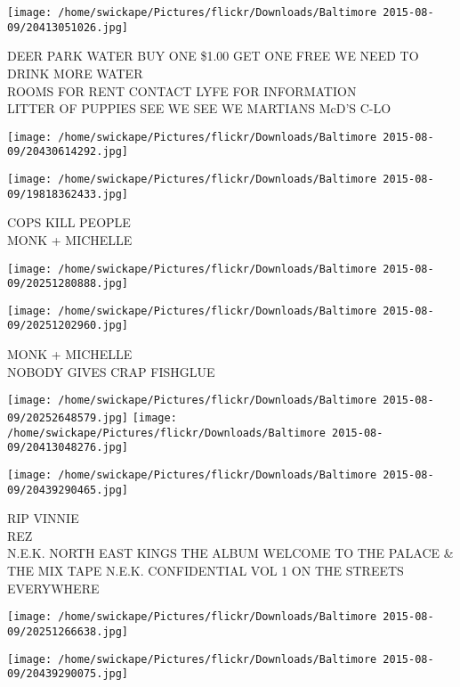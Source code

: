 \documentclass[10pt,letterpaper]{article}
\begin{document}
\texttt{[image: /home/swickape/Pictures/flickr/Downloads/Baltimore 2015-08-09/20413051026.jpg]}

DEER PARK WATER BUY ONE \$1.00 GET ONE FREE WE NEED TO DRINK MORE WATER\\
ROOMS FOR RENT CONTACT LYFE FOR INFORMATION\\
LITTER OF PUPPIES SEE WE SEE WE MARTIANS McD'S C{-}LO\\
\pagebreak

\texttt{[image: /home/swickape/Pictures/flickr/Downloads/Baltimore 2015-08-09/20430614292.jpg]}

\vspace{0.25in}
\texttt{[image: /home/swickape/Pictures/flickr/Downloads/Baltimore 2015-08-09/19818362433.jpg]}

COPS KILL PEOPLE\\
MONK + MICHELLE\\
\pagebreak

\texttt{[image: /home/swickape/Pictures/flickr/Downloads/Baltimore 2015-08-09/20251280888.jpg]}

\vspace{0.25in}
\texttt{[image: /home/swickape/Pictures/flickr/Downloads/Baltimore 2015-08-09/20251202960.jpg]}

MONK + MICHELLE\\
NOBODY GIVES CRAP FISHGLUE\\
\pagebreak

\texttt{[image: /home/swickape/Pictures/flickr/Downloads/Baltimore 2015-08-09/20252648579.jpg]}
\texttt{[image: /home/swickape/Pictures/flickr/Downloads/Baltimore 2015-08-09/20413048276.jpg]}

\vspace{0.25in}
\texttt{[image: /home/swickape/Pictures/flickr/Downloads/Baltimore 2015-08-09/20439290465.jpg]}

RIP VINNIE\\
REZ\\
N.E.K. NORTH EAST KINGS THE ALBUM WELCOME TO THE PALACE \& THE MIX TAPE N.E.K. CONFIDENTIAL VOL 1 ON THE STREETS EVERYWHERE\\
\pagebreak

\texttt{[image: /home/swickape/Pictures/flickr/Downloads/Baltimore 2015-08-09/20251266638.jpg]}

\vspace{0.25in}
\texttt{[image: /home/swickape/Pictures/flickr/Downloads/Baltimore 2015-08-09/20439290075.jpg]}
\end{document}
